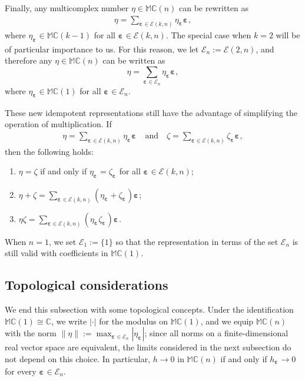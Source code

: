 \documentclass[12pt]{amsart}
\theoremstyle{plain}
\theoremstyle{definition}
\numberwithin{equation}{section}
\newcommand{\bep}[1]{\bm{\varepsilon_{#1}}}
\newcommand{\mC}{\mathbb{C}}
\newcommand{\mM}{\mathbb{M}}
\newcommand{\ra}{\rightarrow}
\begin{document}
		Finally, any multicomplex number $\eta \in \mM \mC (n)$ can be rewritten as
		\begin{align*}
		\eta = \sum_{\bep{} \in \mathcal{E}(k, n)} \eta_{\bep{}} \bep{} ,
		\end{align*}
	where $\eta_{\bep{}} \in \mM\mC (k-1)$ for all $\bep{} \in \mathcal{E}(k, n)$. The special case when $k = 2$ will be of particular importance to us. For this reason, we let $\mathcal{E}_n := \mathcal{E} (2, n)$, and therefore any $\eta \in \mM \mC (n)$ can be written as
    \begin{equation}  
        \eta = \sum_{\bep{} \in \mathcal{E}_n} \eta_{\bep{}} \bep{} ,    \label{Eq:IdempReprComplex}
    \end{equation}
    where $\eta_{\bep{}} \in \mM \mC (1)$ for all $\bep{} \in \mathcal{E}_n$.
	
	These new idempotent representations still have the advantage of simplifying the operation of multiplication. If
		\begin{align*}
		\eta = \sum_{\bep{} \in \mathcal{E} (k, n)} \eta_{\bep{}} \bep{} \quad \text{and} \quad \zeta = \sum_{\bep{} \in \mathcal{E}(k, n)} \zeta_{\bep{}} \bep{},
		\end{align*}
	then the following holds:
		\begin{enumerate}[label=\arabic*)]
		\item $\eta = \zeta$ if and only if $\eta_{\bep{}} = \zeta_{\bep{}}$ for all $\bep{} \in \mathcal{E} (k, n)$;
		\item $\eta + \zeta = \sum_{\bep{} \in \mathcal{E} (k, n)} (\eta_{\bep{}} + \zeta_{\bep{}}) \bep{}$;
		\item $\eta \zeta = \sum_{\bep{} \in \mathcal{E} (k , n)} (\eta_{\bep{}} \zeta_{\bep{}}) \bep{}$.
		\end{enumerate}
When $n = 1$, we set $\mathcal{E}_1 := \{1 \}$ so that the representation in terms of the set $\mathcal{E}_n$ is still valid with coefficients in $\mM \mC (1)$. 

\subsection{Topological considerations} We end this subsection with some topological concepts. 
Under the identification $\mM \mC(1) \cong \mC$, we
write $| \cdot |$ for the modulus on $\mM \mC(1)$, and we equip $\mM \mC(n)$
with the norm $\| \eta \| := \max_{\bep{} \in \mathcal{E}_n} | \eta_{\bep{}} |$; since all
norms on a finite-dimensional real vector space are equivalent, the limits
considered in the next subsection do not depend on this choice. In particular, $h \ra 0$ in
$\mM \mC(n)$ if and only if $h_{\bep{}} \ra 0$ for every $\bep{} \in \mathcal{E}_n$. 
\end{document}
